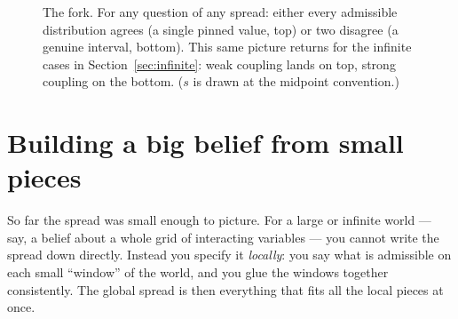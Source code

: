 \documentclass[]{article}
\begin{document}
\begin{figure}[ht]
\centering
{}
\caption{The fork. For any question of any spread: either every admissible
distribution agrees (a single pinned value, top) or two disagree (a genuine
interval, bottom). This same picture returns for the infinite cases in
Section~\ref{sec:infinite}: weak coupling lands on top, strong coupling on the
bottom. ($s$ is drawn at the midpoint convention.)}
\label{fig:fork}
\end{figure}

\section{Building a big belief from small pieces}\label{sec:build}

So far the spread was small enough to picture. For a large or infinite world ---
say, a belief about a whole grid of interacting variables --- you cannot write
the spread down directly. Instead you specify it \emph{locally}: you say what is
admissible on each small ``window'' of the world, and you glue the windows
together consistently. The global spread is then everything that fits all the
local pieces at once.
\end{document}

